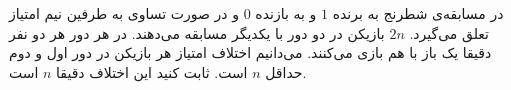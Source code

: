     \p 
در مسابقه‌ی شطرنج به برنده
$1$
و به بازنده
$0$
و در صورت تساوی به طرفین نیم امتیاز تعلق می‌گیرد.
$2n$
بازیکن در دو دور با یکدیگر مسابقه می‌دهند. در هر دور هر دو نفر دقیقا یک باز با هم بازی می‌کنند. می‌دانیم اختلاف امتیاز هر بازیکن در دور اول و دوم حداقل
$n$
است. ثابت کنید این اختلاف دقیقا
$n$
است.